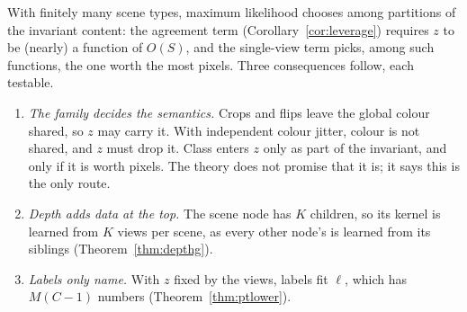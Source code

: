 \documentclass[11pt]{article}
\theoremstyle{definition}
\begin{document}
\noindent With finitely many scene types, maximum likelihood chooses among partitions of the invariant content: the
agreement term (Corollary~\ref{cor:leverage}) requires $z$ to be (nearly) a function of $O(S)$, and the single-view term
picks, among such functions, the one worth the most pixels. Three consequences follow, each testable.
\begin{enumerate}
\item \emph{The family decides the semantics.} Crops and flips leave the global colour shared, so $z$ may carry it. With
independent colour jitter, colour is not shared, and $z$ must drop it. Class enters $z$ only as part of the invariant,
and only if it is worth pixels. The theory does not promise that it is; it says this is the only route.
\item \emph{Depth adds data at the top.} The scene node has $K$ children, so its kernel is learned from $K$ views per
scene, as every other node's is learned from its siblings (Theorem~\ref{thm:depthg}).
\item \emph{Labels only name.} With $z$ fixed by the views, labels fit $\ell$, which has $M(C-1)$ numbers
(Theorem~\ref{thm:ptlower}).
\end{enumerate}
\end{document}
